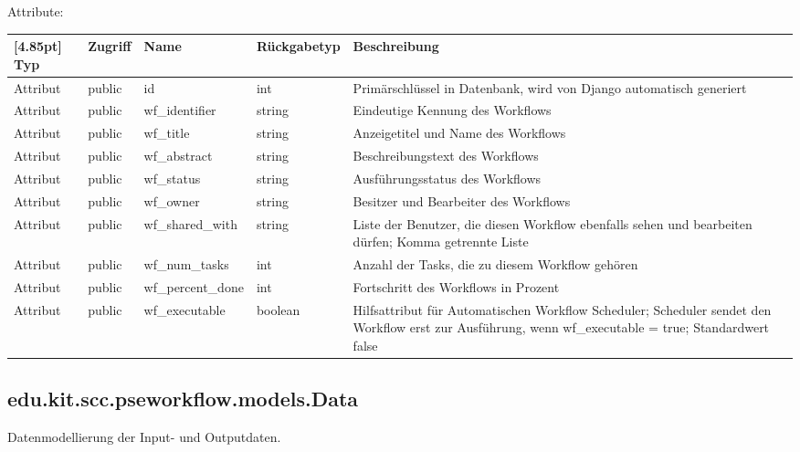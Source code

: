             Attribute:
            \begin{center}
            	\renewcommand{\arraystretch}{1.5}
	            \setlength\tabcolsep{5pt}
            	\begin{tabularx}{\textwidth}{|l|l|l|l|X|}
            		\hline
                    \rowcolor[gray]{0.75}[4.85pt]            		
            	    Typ & Zugriff & Name & Rückgabetyp & Beschreibung \\ \hline
            		Attribut & public & id & int & Primärschlüssel in Datenbank, wird von Django automatisch generiert \\ \hline
					Attribut & public & wf\_identifier & string & Eindeutige Kennung des Workflows\\ \hline
					Attribut & public & wf\_title & string & Anzeigetitel und Name des Workflows\\ \hline
					Attribut & public & wf\_abstract & string & Beschreibungstext des Workflows\\ \hline					
					Attribut & public & wf\_status & string & Ausführungsstatus des Workflows\\ \hline
					Attribut & public & wf\_owner & string & Besitzer und Bearbeiter des Workflows\\ \hline
					Attribut & public & wf\_shared\_with & string & Liste der Benutzer, die diesen Workflow ebenfalls sehen und bearbeiten dürfen; Komma getrennte Liste\\ \hline
					Attribut & public & wf\_num\_tasks & int & Anzahl der Tasks, die zu diesem Workflow gehören\\ \hline
					Attribut & public & wf\_percent\_done & int & Fortschritt des Workflows in Prozent\\ \hline
					Attribut & public & wf\_executable & boolean & Hilfsattribut für Automatischen Workflow Scheduler; Scheduler sendet den Workflow erst zur Ausführung, wenn wf\_executable = true; Standardwert false \\				
					\hline            		
            	\end{tabularx}
            \end{center}
            
            
         \subsection{edu.kit.scc.pseworkflow.models.Data}   
	         Datenmodellierung der Input- und Outputdaten.
	         
